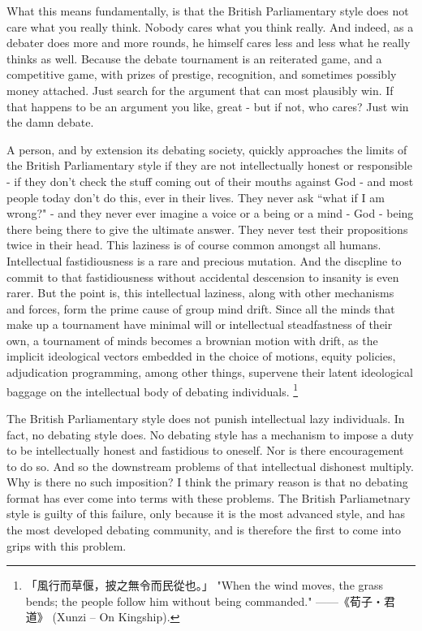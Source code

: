 \begin{itemize}
    What this means fundamentally, is that the British Parliamentary style does not care what you really think. Nobody cares what you think really. And indeed, as a debater does more and more rounds, he himself cares less and less what he really thinks as well. Because the debate tournament is an reiterated game, and a competitive game, with prizes of prestige, recognition, and sometimes possibly money attached. Just search for the argument that can most plausibly win. If that happens to be an argument you like, great - but if not, who cares? Just win the damn debate.


A person, and by extension its debating society, quickly approaches the limits of the British Parliamentary style if they are not intellectually honest or responsible - if they don't check the stuff coming out of their mouths against God - and most people today don't do this, ever in their lives. They never ask “what if I am wrong?" - and they never ever imagine a voice or a being or a mind - God - being there being there to give the ultimate answer. They never test their propositions twice in their head. This laziness is of course common amongst all humans. Intellectual fastidiousness is a rare and precious mutation. And the discpline to commit to that fastidiousness without accidental descension to insanity is even rarer. But the point is, this intellectual laziness, along with other mechanisms and forces, form the prime cause of group mind drift. Since all the minds that make up a tournament have minimal will or intellectual steadfastness of their own, a tournament of minds becomes a brownian motion with drift, as the implicit ideological vectors embedded in the choice of motions, equity policies, adjudication programming, among other things, supervene their latent ideological baggage on the intellectual body of debating individuals. \footnote{「風行而草偃，披之無令而民從也。」
"When the wind moves, the grass bends; the people follow him without being commanded." ——《荀子‧君道》 (Xunzi – On Kingship).
}

The British Parliamentary style does not punish intellectual lazy individuals. In fact, no debating style does. No debating style has a mechanism to impose a duty to be intellectually honest and fastidious to oneself. Nor is there encouragement to do so. And so the downstream problems of that intellectual dishonest multiply. Why is there no such imposition? I think the primary reason is that no debating format has ever come into terms with these problems. The British Parliametnary style is guilty of this failure, only because it is the most advanced style, and has the most developed debating community, and is therefore the first to come into grips with this problem.
    

\end{itemize}
